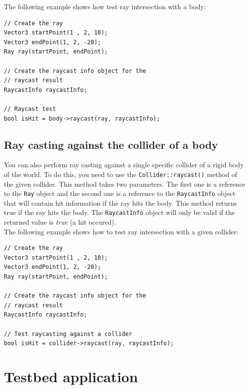 \documentclass[a4paper,12pt]{article}
\begin{document}
    The following example shows how test ray intersection with a body: \\

    \begin{lstlisting}
// Create the ray
Vector3 startPoint(1 , 2, 10);
Vector3 endPoint(1, 2, -20);
Ray ray(startPoint, endPoint);

// Create the raycast info object for the
// raycast result
RaycastInfo raycastInfo;

// Raycast test
bool isHit = body->raycast(ray, raycastInfo);
    \end{lstlisting}

    \vspace{0.6cm}

    \subsection{Ray casting against the collider of a body}

    You can also perform ray casting against a single specific collider of a rigid body of the world. To do this, you need to use the
    \texttt{Collider::raycast()} method of the given collider. This method takes two parameters. The first one is a reference to the \texttt{Ray}
    object and the second one is a reference to the \texttt{RaycastInfo} object that will contain hit information if the ray hits the body. This method returns
    true if the ray hits the body. The \texttt{RaycastInfo} object will only be valid if the returned value is \emph{true} (a hit occured). \\

    The following example shows how to test ray intersection with a given collider: \\

    \begin{lstlisting}
// Create the ray
Vector3 startPoint(1 , 2, 10);
Vector3 endPoint(1, 2, -20);
Ray ray(startPoint, endPoint);

// Create the raycast info object for the
// raycast result
RaycastInfo raycastInfo;

// Test raycasting against a collider
bool isHit = collider->raycast(ray, raycastInfo);
    \end{lstlisting}

    \vspace{0.6cm}

    \section{Testbed application}
    \label{sec:testbed}
\end{document}
